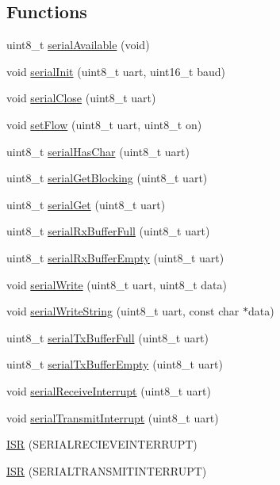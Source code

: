 \subsection*{Functions}
\begin{DoxyCompactItemize}
\item 
uint8\+\_\+t \hyperlink{group__uart_ga1ea963b291215ad9c5e8a0610f116b90}{serial\+Available} (void)
\item 
void \hyperlink{group__uart_ga73d4335cb201753c580c87954f493886}{serial\+Init} (uint8\+\_\+t uart, uint16\+\_\+t baud)
\item 
void \hyperlink{group__uart_gaa16a5ecaf9e40660ded50737ff1d0a88}{serial\+Close} (uint8\+\_\+t uart)
\item 
void \hyperlink{group__uart_ga5d5de9e3ed5a0be11f707113cfff33f5}{set\+Flow} (uint8\+\_\+t uart, uint8\+\_\+t on)
\item 
uint8\+\_\+t \hyperlink{group__uart_ga266a54dcf3c4b85d92bf6b16bdcb5069}{serial\+Has\+Char} (uint8\+\_\+t uart)
\item 
uint8\+\_\+t \hyperlink{group__uart_gaf7c4238a9a5e8fff64af1faf1689a5a4}{serial\+Get\+Blocking} (uint8\+\_\+t uart)
\item 
uint8\+\_\+t \hyperlink{group__uart_gaa9d6e44600b215154c3f66193df151f6}{serial\+Get} (uint8\+\_\+t uart)
\item 
uint8\+\_\+t \hyperlink{group__uart_ga73d16b244172336e7306ea2e4cf90fa1}{serial\+Rx\+Buffer\+Full} (uint8\+\_\+t uart)
\item 
uint8\+\_\+t \hyperlink{group__uart_ga742268372398b85935564fded999b198}{serial\+Rx\+Buffer\+Empty} (uint8\+\_\+t uart)
\item 
void \hyperlink{group__uart_ga388583adaa7db4fad121b6454668b347}{serial\+Write} (uint8\+\_\+t uart, uint8\+\_\+t data)
\item 
void \hyperlink{group__uart_ga054d68834f9ca19f3b2cf9d714337de4}{serial\+Write\+String} (uint8\+\_\+t uart, const char $\ast$data)
\item 
uint8\+\_\+t \hyperlink{group__uart_ga8a6adfd3c350ceb55605d003a62a36a4}{serial\+Tx\+Buffer\+Full} (uint8\+\_\+t uart)
\item 
uint8\+\_\+t \hyperlink{group__uart_ga14c345ea0707111e988a80ef1da65e32}{serial\+Tx\+Buffer\+Empty} (uint8\+\_\+t uart)
\item 
void \hyperlink{group__uart_gae943e7783790ebcc3e9abc6921949be8}{serial\+Receive\+Interrupt} (uint8\+\_\+t uart)
\item 
void \hyperlink{group__uart_ga711c6d173f7a379426d995760ed95f1b}{serial\+Transmit\+Interrupt} (uint8\+\_\+t uart)
\item 
\hyperlink{group__uart_ga7a36d30320b27d7d863762b7e54b540d}{I\+S\+R} (S\+E\+R\+I\+A\+L\+R\+E\+C\+I\+E\+V\+E\+I\+N\+T\+E\+R\+R\+U\+P\+T)
\item 
\hyperlink{group__uart_gac456aaea36551ccfea05338b693f6f82}{I\+S\+R} (S\+E\+R\+I\+A\+L\+T\+R\+A\+N\+S\+M\+I\+T\+I\+N\+T\+E\+R\+R\+U\+P\+T)
\end{DoxyCompactItemize}
